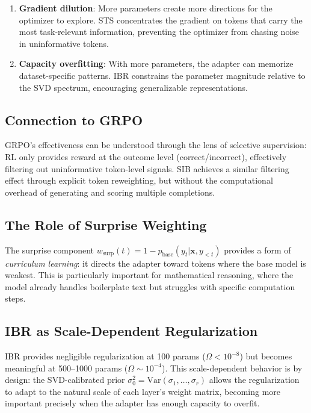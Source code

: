 \documentclass{article}
\begin{document}
\begin{enumerate}[leftmargin=*]
  \item \textbf{Gradient dilution}: More parameters create more directions for the optimizer to explore. STS concentrates the gradient on tokens that carry the most task-relevant information, preventing the optimizer from chasing noise in uninformative tokens.
  \item \textbf{Capacity overfitting}: With more parameters, the adapter can memorize dataset-specific patterns. IBR constrains the parameter magnitude relative to the SVD spectrum, encouraging generalizable representations.
\end{enumerate}

\subsection{Connection to GRPO}

GRPO's effectiveness can be understood through the lens of selective supervision: RL only provides reward at the outcome level (correct/incorrect), effectively filtering out uninformative token-level signals. SIB achieves a similar filtering effect through explicit token reweighting, but without the computational overhead of generating and scoring multiple completions.

\subsection{The Role of Surprise Weighting}

The surprise component $w_{\text{surp}}(t) = 1 - p_{\text{base}}(y_t | \mathbf{x}, y_{<t})$ provides a form of \textit{curriculum learning}: it directs the adapter toward tokens where the base model is weakest. This is particularly important for mathematical reasoning, where the model already handles boilerplate text but struggles with specific computation steps.

\subsection{IBR as Scale-Dependent Regularization}

IBR provides negligible regularization at 100 params ($\Omega < 10^{-8}$) but becomes meaningful at 500--1000 params ($\Omega \sim 10^{-4}$). This scale-dependent behavior is by design: the SVD-calibrated prior $\sigma_0^2 = \text{Var}(\sigma_1, \ldots, \sigma_r)$ allows the regularization to adapt to the natural scale of each layer's weight matrix, becoming more important precisely when the adapter has enough capacity to overfit.
\end{document}
